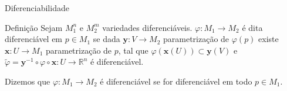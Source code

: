 \documentclass[aspectratio=169]{beamer}
\begin{document}
\begin{frame}{Diferenciabilidade}
	\begin{block}{Definição}
		Sejam $M_{1}^{n}$ e $M_{2}^{m}$ variedades diferenciáveis. $\varphi:M_{1} \to M_{2}$ é dita diferenciável em $p \in M_{1}$ se dada $\mathbf{y}:V\to M_{2}$ parametrização de $\varphi(p)$ existe $\mathbf{x}:U\to M_{1}$ parametrização de $p$, tal que $\varphi(\mathbf{x}(U)) \subset \mathbf{y}(V)$ e $\tilde{\varphi}=\mathbf{y}^{-1}\circ\varphi \circ \mathbf{x}:U \to \mathbb{R}^{n}$ é diferenciável.

		\pause

		Dizemos que $\varphi:M_{1}\to M_{2}$ é diferenciável se for diferenciável em todo $p \in M_{1}$.
	\end{block}
\end{frame}
\end{document}
